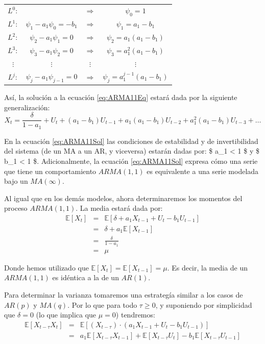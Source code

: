 \documentclass[
]{book}
\begin{document}
\begin{center}
\begin{tabular}{ c c c c } 
    $L^0 :$ & $ $ & $\Rightarrow$ & $\psi_0 = 1$ \\
    $L^1 :$ & $\psi_1 - a_1 \psi_0 = - b_1$ & $\Rightarrow$ & $\psi_1 = a_1 - b_1$ \\
    $L^2 :$ & $\psi_2 - a_1 \psi_1 = 0$ & $\Rightarrow$ & $\psi_2 = a_1(a_1 - b_1)$ \\
    $L^3 :$ & $\psi_3 - a_1 \psi_2 = 0$ & $\Rightarrow$ & $\psi_3 = a^2_1(a_1 - b_1)$ \\
    $\vdots$ & $\vdots$ & $\vdots$ & $\vdots$ \\
    $L^j :$ & $\psi_j - a_1 \psi_{j - 1} = 0$ & $\Rightarrow$ & $\psi_j = a^{j - 1}_1(a_1 - b_1)$
\end{tabular}
\end{center}

Así, la solución a la ecuación \eqref{eq:ARMA11Eq} estará dada por la siguiente generalización:
\begin{equation}
    X_t = \frac{\delta}{1 - a_1} + U_t + (a_1 - b_1) U_{t - 1} + a_1(a_1 - b_1) U_{t - 2} + a_1^2(a_1 - b_1) U_{t - 3} + \ldots
    \label{eq:ARMA11Sol}
\end{equation}

En la ecuación \eqref{eq:ARMA11Sol} las condiciones de estabilidad y de invertibilidad del sistema (de un MA a un AR, y viceversa) estarán dadas por: \$ \textbar{} a\_1 \textbar{} \textless{} 1 \$ y \$ \textbar{} b\_1 \textbar{} \textless{} 1 \$. Adicionalmente, la ecuación \eqref{eq:ARMA11Sol} expresa cómo una serie que tiene un comportamiento \(ARMA(1, 1)\) es equivalente a una serie modelada bajo un \(MA(\infty)\).

Al igual que en los demás modelos, ahora determinaremos los momentos del proceso \(ARMA(1, 1)\). La media estará dada por:
\begin{eqnarray}
    \mathbb{E}[X_t] & = & \mathbb{E}[\delta + a_1 X_{t-1} + U_t - b_1 U_{t-1}] \nonumber \\
    & = & \delta + a_1 \mathbb{E}[X_{t-1}] \nonumber \\
    & = & \frac{\delta}{1 - a_1} \nonumber \\
    & = & \mu
\end{eqnarray}

Donde hemos utilizado que \(\mathbb{E}[X_t] = \mathbb{E}[X_{t-1}] = \mu\). Es decir, la media de un \(ARMA(1, 1)\) es idéntica a la de un \(AR(1)\).

Para determinar la varianza tomaremos una estrategía similar a los casos de \(AR(p)\) y \(MA(q)\). Por lo que para todo \(\tau \geq 0\), y suponiendo por simplicidad que \(\delta = 0\) (lo que implica que \(\mu = 0\)) tendremos:
\begin{eqnarray}
    \mathbb{E}[X_{t-\tau} X_t] & = & \mathbb{E}[(X_{t-\tau}) \cdot (a_1 X_{t-1} + U_t - b_1 U_{t-1})] \nonumber \\
    & = & a_1 \mathbb{E}[X_{t-\tau} X_{t-1}] + \mathbb{E}[X_{t-\tau} U_t] - b_1 \mathbb{E}[X_{t-\tau} U_{t-1}]
    \label{eq:ARMA11Cov}
\end{eqnarray}
\end{document}

